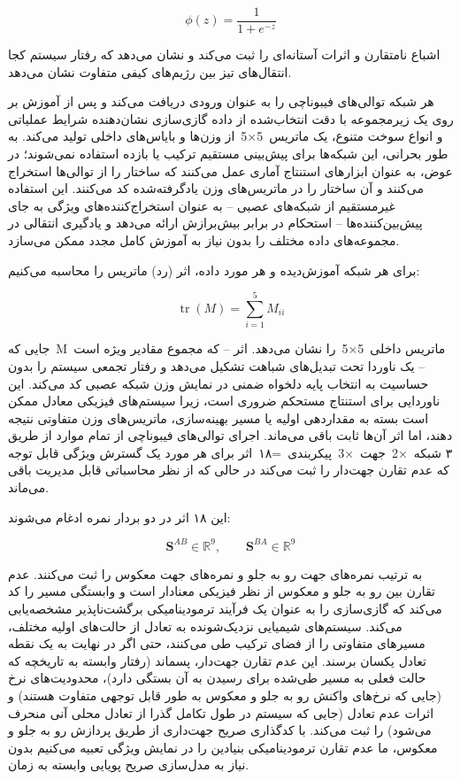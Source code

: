 \documentclass[12pt, a4paper]{article}
\begin{document}
\begin{equation}
\phi(z)=\frac{1}{1+e^{-z}}
\end{equation}

اشباع نامتقارن و اثرات آستانه‌ای را ثبت می‌کند و نشان می‌دهد که رفتار سیستم کجا انتقال‌های تیز بین رژیم‌های کیفی متفاوت نشان می‌دهد.

هر شبکه توالی‌های فیبوناچی را به عنوان ورودی دریافت می‌کند و پس از آموزش بر روی یک زیرمجموعه با دقت انتخاب‌شده از داده گازی‌سازی نشان‌دهنده شرایط عملیاتی و انواع سوخت متنوع، یک ماتریس 5×5 از وزن‌ها و بایاس‌های داخلی تولید می‌کند. به طور بحرانی، این شبکه‌ها برای پیش‌بینی مستقیم ترکیب یا بازده استفاده نمی‌شوند؛ در عوض، به عنوان ابزارهای استنتاج آماری عمل می‌کنند که ساختار را از توالی‌ها استخراج می‌کنند و آن ساختار را در ماتریس‌های وزن یادگرفته‌شده کد می‌کنند. این استفاده غیرمستقیم از شبکه‌های عصبی – به عنوان استخراج‌کننده‌های ویژگی به جای پیش‌بین‌کننده‌ها – استحکام در برابر بیش‌برازش ارائه می‌دهد و یادگیری انتقالی در مجموعه‌های داده مختلف را بدون نیاز به آموزش کامل مجدد ممکن می‌سازد.

برای هر شبکه آموزش‌دیده و هر مورد داده، اثر (رد) ماتریس را محاسبه می‌کنیم:

\begin{equation}
\operatorname{tr}(M)=\sum_{i=1}^{5} M_{ii}
\end{equation}

جایی که M ماتریس داخلی 5×5 را نشان می‌دهد. اثر – که مجموع مقادیر ویژه است – یک ناوردا تحت تبدیل‌های شباهت تشکیل می‌دهد و رفتار تجمعی سیستم را بدون حساسیت به انتخاب پایه دلخواه ضمنی در نمایش وزن شبکه عصبی کد می‌کند. این ناوردایی برای استنتاج مستحکم ضروری است، زیرا سیستم‌های فیزیکی معادل ممکن است بسته به مقداردهی اولیه یا مسیر بهینه‌سازی، ماتریس‌های وزن متفاوتی نتیجه دهند، اما اثر آن‌ها ثابت باقی می‌ماند. اجرای توالی‌های فیبوناچی از تمام موارد از طریق ۳ شبکه ×2 جهت ×3 پیکربندی =۱۸ اثر برای هر مورد یک گسترش ویژگی قابل توجه که عدم تقارن جهت‌دار را ثبت می‌کند در حالی که از نظر محاسباتی قابل مدیریت باقی می‌ماند.

این ۱۸ اثر در دو بردار نمره ادغام می‌شوند:

\begin{equation}
\mathbf{S}^{AB}\in\mathbb{R}^{9},\qquad \mathbf{S}^{BA}\in\mathbb{R}^{9}
\end{equation}

به ترتیب نمره‌های جهت رو به جلو و نمره‌های جهت معکوس را ثبت می‌کنند. عدم تقارن بین رو به جلو و معکوس از نظر فیزیکی معنادار است و وابستگی مسیر را کد می‌کند که گازی‌سازی را به عنوان یک فرآیند ترمودینامیکی برگشت‌ناپذیر مشخصه‌یابی می‌کند. سیستم‌های شیمیایی نزدیک‌شونده به تعادل از حالت‌های اولیه مختلف، مسیرهای متفاوتی را از فضای ترکیب طی می‌کنند، حتی اگر در نهایت به یک نقطه تعادل یکسان برسند. این عدم تقارن جهت‌دار، پسماند (رفتار وابسته به تاریخچه که حالت فعلی به مسیر طی‌شده برای رسیدن به آن بستگی دارد)، محدودیت‌های نرخ (جایی که نرخ‌های واکنش رو به جلو و معکوس به طور قابل توجهی متفاوت هستند) و اثرات عدم تعادل (جایی که سیستم در طول تکامل گذرا از تعادل محلی آنی منحرف می‌شود) را ثبت می‌کند. با کدگذاری صریح جهت‌داری از طریق پردازش رو به جلو و معکوس، ما عدم تقارن ترمودینامیکی بنیادین را در نمایش ویژگی تعبیه می‌کنیم بدون نیاز به مدل‌سازی صریح پویایی وابسته به زمان.
\end{document}
